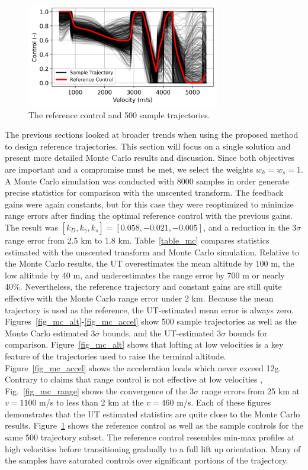 \documentclass[journal ]{new-aiaa}
\begin{document}
\begin{figure}[h!]
	\centering
	\includegraphics[width=0.75\textwidth]{ddp/python/Control}
	\caption{The reference control and 500 sample trajectories.}
	\label{fig_mc_control}
\end{figure}
The previous sections looked at broader trends when using the proposed method to design reference trajectories. This section will focus on a single solution and present more detailed Monte Carlo results and discussion. Since both objectives are important and a compromise must be met, we select the weights $w_h=w_s=1$. A Monte Carlo simulation was conducted with 8000 samples in order generate precise statistics for comparison with the unscented transform. The feedback gains were again constants, but for this case they were reoptimized to minimize range errors after finding the optimal reference control with the previous gains. The result was $[k_D, k_{\gamma}, k_s] = [0.058, -0.021, -0.005]$, and a reduction in the 3$\sigma$ range error from 2.5 km to 1.8 km.
Table~\ref{table_mc} compares statistics estimated with the unscented transform and Monte Carlo simulation. Relative to the Monte Carlo results, the UT overestimates the mean altitude by 100 m, the low altitude by 40 m, and underestimates the range error by 700 m or nearly 40\%. Nevertheless, the reference trajectory and constant gains are still quite effective with the Monte Carlo range error under 2 km. Because the mean trajectory is used as the reference, the UT-estimated mean error is always zero. 
Figures~\ref{fig_mc_alt}-\ref{fig_mc_accel} show 500 sample trajectories as well as the Monte Carlo estimated 3$\sigma$ bounds, and the UT-estimated 3$\sigma$ bounds for comparison. Figure~\ref{fig_mc_alt} shows that lofting at low velocities is a key feature of the trajectories used to raise the terminal altitude. Figure~\ref{fig_mc_accel} shows the acceleration loads which never exceed 12g.
Contrary to claims that range control is not effective at low velocities \cite{MSL_EDL2}, Fig.~\ref{fig_mc_range} shows the convergence of the 3$\sigma$ range errors from 25 km at $ v=1100 $ m/s to less than 2 km at the $v=460$ m/s. Each of these figures demonstrates that the UT estimated statistics are quite close to the Monte Carlo results. Figure~\ref{fig_mc_control} shows the reference control as well as the sample controls for the same 500 trajectory subset. The reference control resembles min-max profiles at high velocities before transitioning gradually to a full lift up orientation. Many of the samples have saturated controls over significant portions of the trajectory.  
\end{document}

